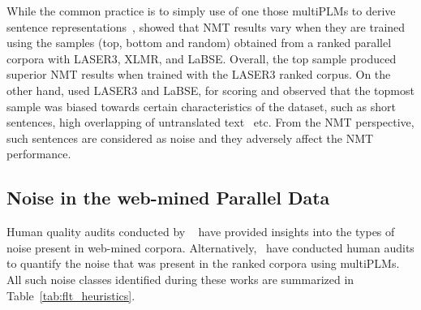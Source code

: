 While the common practice is to simply use of one those multiPLMs to derive sentence representations~\citet{steingrimsson2023sentence,gala2023indictrans2},\citet{ranathunga2024quality} showed that NMT results vary when they are trained using the samples (top, bottom and random) obtained from a ranked parallel corpora with LASER3, XLMR, and LaBSE. Overall, the top sample produced superior NMT results when trained with the LASER3 ranked corpus. On the other hand, \citet{moon2023doubts} used LASER3 and LaBSE, for scoring and observed that the topmost sample was biased towards certain characteristics of the dataset, such as short sentences, high overlapping of untranslated text~\cite{herold2022detecting} etc. From the NMT perspective, such sentences are considered as noise and they adversely affect the NMT performance.

\subsection{Noise in the web-mined Parallel Data}
Human quality audits conducted by ~\citet{khayrallah2018impact,kreutzer2022quality} have provided insights into the types of noise present in web-mined corpora. Alternatively,~\citet{ranathunga2024quality,bane2022comparison} have conducted human audits to quantify the noise that was present in the ranked corpora using multiPLMs. All such noise classes identified during these works are summarized in Table~\ref{tab:flt_heuristics}.\\

